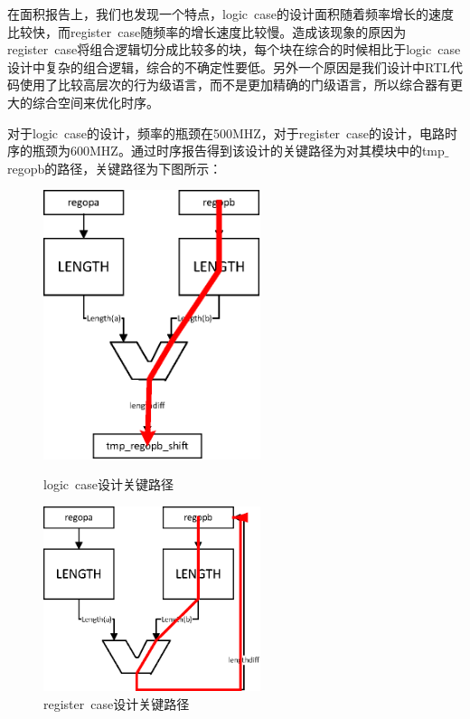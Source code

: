 \documentclass[12pt]{article}
\begin{document}
在面积报告上，我们也发现一个特点，logic~case的设计面积随着频率增长的速度比较快，而register~case随频率的增长速度比较慢。造成该现象的原因为register~case将组合逻辑切分成比较多的块，每个块在综合的时候相比于logic~case设计中复杂的组合逻辑，综合的不确定性要低。另外一个原因是我们设计中RTL代码使用了比较高层次的行为级语言，而不是更加精确的门级语言，所以综合器有更大的综合空间来优化时序。

对于logic~case的设计，频率的瓶颈在500MHZ，对于register~case的设计，电路时序的瓶颈为600MHZ。通过时序报告得到该设计的关键路径为对其模块中的tmp$\_$regopb的路径，关键路径为下图所示：



\begin{figure}[H]
\begin{minipage}[t]{0.5\linewidth}
\centering
\includegraphics[width=2.5in]{./lowpowerdesign/align_mdel_logic_case_crtical_path.eps}
\caption{logic~case设计关键路径}
\label{gcd_hist}
\end{minipage}%
\begin{minipage}[t]{0.5\linewidth}
\centering
\includegraphics[width=2.5in]{./lowpowerdesign/align_model_register_case_critical_path.eps}
\caption{register~case设计关键路径}
\label{stein_hist}
\end{minipage}
\end{figure}
\end{document}
